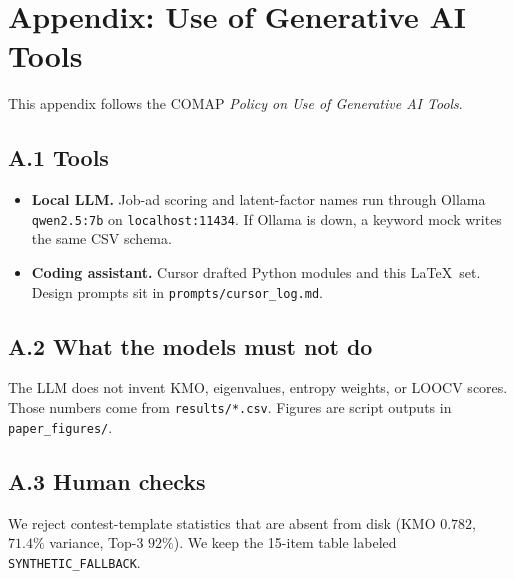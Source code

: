 \section*{Appendix: Use of Generative AI Tools}
\label{app:ai-disclosure}

This appendix follows the COMAP \emph{Policy on Use of Generative AI Tools}.

\subsection*{A.1 Tools}

\begin{itemize}
  \item \textbf{Local LLM.}
        Job-ad scoring and latent-factor names run through Ollama
        \texttt{qwen2.5:7b} on \texttt{localhost:11434}.
        If Ollama is down, a keyword mock writes the same CSV schema.
  \item \textbf{Coding assistant.}
        Cursor drafted Python modules and this \LaTeX\ set.
        Design prompts sit in \texttt{prompts/cursor\_log.md}.
\end{itemize}

\subsection*{A.2 What the models must not do}

The LLM does not invent KMO, eigenvalues, entropy weights, or LOOCV scores.
Those numbers come from \texttt{results/*.csv}.
Figures are script outputs in \texttt{paper\_figures/}.

\subsection*{A.3 Human checks}

We reject contest-template statistics that are absent from disk
(KMO \(0.782\), \(71.4\%\) variance, Top-3 \(92\%\)).
We keep the 15-item table labeled \texttt{SYNTHETIC\_FALLBACK}.
